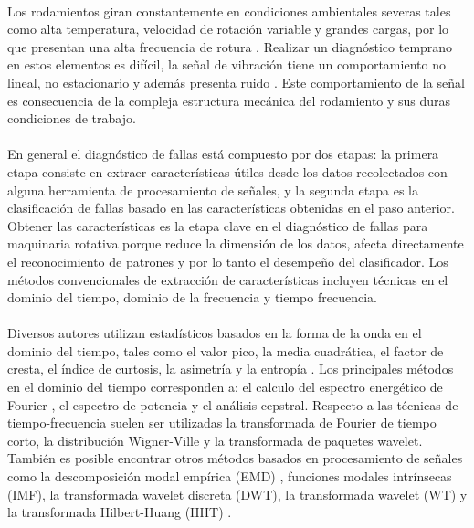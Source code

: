 \documentclass[12pt]{article}%
\begin{document}
\paragraph{}
Los rodamientos giran constantemente en condiciones ambientales severas tales como alta temperatura, velocidad de rotación variable y grandes cargas, por lo que presentan una alta frecuencia de rotura \cite{fu}. Realizar un diagnóstico temprano en estos elementos es difícil, la señal de vibración tiene un comportamiento no lineal, no estacionario y además presenta ruido \cite{li}. Este comportamiento de la señal es consecuencia de la compleja estructura mecánica del rodamiento y sus duras condiciones de trabajo.

\paragraph{}
En general el diagnóstico de fallas está compuesto por dos etapas: la primera etapa consiste en extraer características útiles desde los datos recolectados con alguna herramienta de procesamiento de señales, y la segunda etapa es la clasificación de fallas basado en las características obtenidas en el paso anterior. Obtener las características es la etapa clave en el diagnóstico de fallas para maquinaria rotativa \cite{guo} porque reduce la dimensión de los datos, afecta directamente el reconocimiento de patrones y por lo tanto el desempeño del clasificador. Los métodos convencionales de extracción de características incluyen técnicas en el dominio del tiempo, dominio de la frecuencia y tiempo frecuencia.
 
\paragraph{}
Diversos autores utilizan estadísticos basados en la forma de la onda en el dominio del tiempo, tales como el valor pico, la media cuadrática, el factor de cresta, el índice de curtosis, la asimetría y la entropía \cite{ran}. Los principales métodos en el dominio del tiempo corresponden a: el calculo del espectro energético de Fourier \cite{jia}, el espectro de potencia \cite{li} y el análisis cepstral. Respecto a las  técnicas de tiempo-frecuencia suelen ser utilizadas la transformada de Fourier de tiempo corto, la distribución Wigner-Ville y la transformada de paquetes wavelet. También es posible encontrar otros métodos basados en procesamiento de señales como la descomposición modal empírica (EMD) \cite{yu}, funciones modales intrínsecas (IMF), la transformada wavelet discreta (DWT), la transformada wavelet (WT) \cite{chang} y la transformada Hilbert-Huang (HHT) \cite{rai}.
\end{document}
